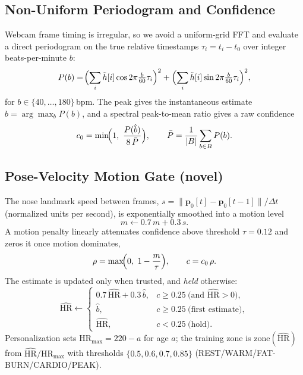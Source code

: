 \documentclass[journal,10pt]{IEEEtran}
\newcommand{\hmax}{\mathrm{HR}_{\max}}
\begin{document}
\subsection{Non-Uniform Periodogram and Confidence}
Webcam frame timing is irregular, so we avoid a uniform-grid FFT and evaluate a
direct periodogram on the true relative timestamps $\tau_i=t_i-t_0$ over integer
beats-per-minute $b$:
\begin{equation}
P(b)=\!\Bigl(\sum_i \tilde h[i]\cos 2\pi\tfrac{b}{60}\tau_i\Bigr)^2
      +\Bigl(\sum_i \tilde h[i]\sin 2\pi\tfrac{b}{60}\tau_i\Bigr)^2,
\end{equation}
for $b\in\{40,\dots,180\}$\,bpm. The peak gives the instantaneous estimate
$\hat b=\arg\max_b P(b)$, and a spectral peak-to-mean ratio gives a raw confidence
\begin{equation}
c_0=\min\!\Bigl(1,\ \frac{P(\hat b)}{8\,\bar P}\Bigr),\qquad
\bar P=\frac{1}{|B|}\sum_{b\in B}P(b).
\label{eq:conf}
\end{equation}

\subsection{Pose-Velocity Motion Gate (novel)}
The nose landmark speed between frames,
$s=\lVert\mathbf{p}_0[t]-\mathbf{p}_0[t-1]\rVert/\Delta t$ (normalized units per
second), is exponentially smoothed into a motion level
\begin{equation}
m \leftarrow 0.7\,m + 0.3\,s .
\end{equation}
A motion penalty linearly attenuates confidence above threshold $\tau=0.12$ and
zeros it once motion dominates,
\begin{equation}
\rho=\max\!\Bigl(0,\ 1-\frac{m}{\tau}\Bigr),\qquad c=c_0\,\rho .
\label{eq:gate}
\end{equation}
The estimate is updated only when trusted, and \emph{held} otherwise:
\begin{equation}
\hat{\mathrm{HR}}\leftarrow
\begin{cases}
0.7\,\hat{\mathrm{HR}}+0.3\,\hat b, & c\ge 0.25\ \text{(and }\hat{\mathrm{HR}}{>}0),\\
\hat b, & c\ge 0.25\ \text{(first estimate)},\\
\hat{\mathrm{HR}}, & c<0.25\ \text{(hold)}.
\end{cases}
\label{eq:hold}
\end{equation}
Personalization sets $\hmax=220-a$ for age $a$; the training zone is
$\mathrm{zone}(\hat{\mathrm{HR}})$ from $\hat{\mathrm{HR}}/\hmax$ with thresholds
$\{0.5,0.6,0.7,0.85\}$ (REST/WARM/FAT-BURN/CARDIO/PEAK).
\end{document}
